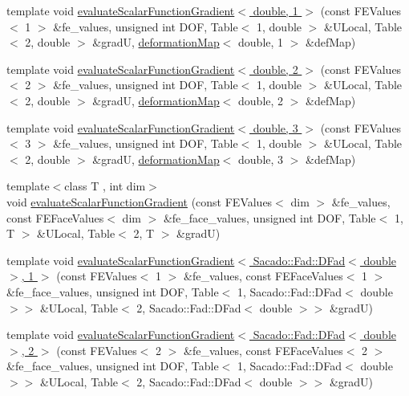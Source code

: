 \begin{DoxyCompactItemize}
\item 
template void \hyperlink{function_evaluations_8cc_a3cc57fd0ac6ea503b820934671353e6f}{evaluate\-Scalar\-Function\-Gradient$<$ double, 1 $>$} (const F\-E\-Values$<$ 1 $>$ \&fe\-\_\-values, unsigned int D\-O\-F, Table$<$ 1, double $>$ \&U\-Local, Table$<$ 2, double $>$ \&grad\-U, \hyperlink{structdeformation_map}{deformation\-Map}$<$ double, 1 $>$ \&def\-Map)
\item 
template void \hyperlink{function_evaluations_8cc_a22ad018eab8d203fd930ad1209435d89}{evaluate\-Scalar\-Function\-Gradient$<$ double, 2 $>$} (const F\-E\-Values$<$ 2 $>$ \&fe\-\_\-values, unsigned int D\-O\-F, Table$<$ 1, double $>$ \&U\-Local, Table$<$ 2, double $>$ \&grad\-U, \hyperlink{structdeformation_map}{deformation\-Map}$<$ double, 2 $>$ \&def\-Map)
\item 
template void \hyperlink{function_evaluations_8cc_a57903628597a149ecf0c07eb33c3cc94}{evaluate\-Scalar\-Function\-Gradient$<$ double, 3 $>$} (const F\-E\-Values$<$ 3 $>$ \&fe\-\_\-values, unsigned int D\-O\-F, Table$<$ 1, double $>$ \&U\-Local, Table$<$ 2, double $>$ \&grad\-U, \hyperlink{structdeformation_map}{deformation\-Map}$<$ double, 3 $>$ \&def\-Map)
\item 
{\footnotesize template$<$class T , int dim$>$ }\\void \hyperlink{group___evaluation_functions_ga4622566d0fe19b017cf8d2643ffeb47a}{evaluate\-Scalar\-Function\-Gradient} (const F\-E\-Values$<$ dim $>$ \&fe\-\_\-values, const F\-E\-Face\-Values$<$ dim $>$ \&fe\-\_\-face\-\_\-values, unsigned int D\-O\-F, Table$<$ 1, T $>$ \&U\-Local, Table$<$ 2, T $>$ \&grad\-U)
\item 
template void \hyperlink{function_evaluations_8cc_a4a0fd4f75bf25ccf08f6da45df20d5a7}{evaluate\-Scalar\-Function\-Gradient$<$ Sacado\-::\-Fad\-::\-D\-Fad$<$ double $>$, 1 $>$} (const F\-E\-Values$<$ 1 $>$ \&fe\-\_\-values, const F\-E\-Face\-Values$<$ 1 $>$ \&fe\-\_\-face\-\_\-values, unsigned int D\-O\-F, Table$<$ 1, Sacado\-::\-Fad\-::\-D\-Fad$<$ double $>$$>$ \&U\-Local, Table$<$ 2, Sacado\-::\-Fad\-::\-D\-Fad$<$ double $>$$>$ \&grad\-U)
\item 
template void \hyperlink{function_evaluations_8cc_a2830ce5e64fad106ba55eb1282bf7f79}{evaluate\-Scalar\-Function\-Gradient$<$ Sacado\-::\-Fad\-::\-D\-Fad$<$ double $>$, 2 $>$} (const F\-E\-Values$<$ 2 $>$ \&fe\-\_\-values, const F\-E\-Face\-Values$<$ 2 $>$ \&fe\-\_\-face\-\_\-values, unsigned int D\-O\-F, Table$<$ 1, Sacado\-::\-Fad\-::\-D\-Fad$<$ double $>$$>$ \&U\-Local, Table$<$ 2, Sacado\-::\-Fad\-::\-D\-Fad$<$ double $>$$>$ \&grad\-U)

\end{DoxyCompactItemize}
